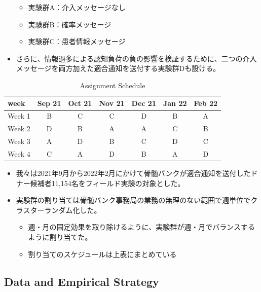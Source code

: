 \documentclass[
  a4paperpaper,
]{article}
\providecommand{\tightlist}{%
  \setlength{\itemsep}{0pt}\setlength{\parskip}{0pt}}\usepackage{longtable,booktabs,array}
\begin{document}
\begin{itemize}
  \begin{itemize}
  \tightlist
  \item
    実験群A：介入メッセージなし
  \item
    実験群B：確率メッセージ
  \item
    実験群C：患者情報メッセージ
  \end{itemize}
\item
  さらに、情報過多による認知負荷の負の影響を検証するために、二つの介入メッセージを両方加えた適合通知を送付する実験群Dも設ける。
\end{itemize}

\begin{table}

\caption{Assignment Schedule}
\centering
\begin{tabular}[t]{lcccccc}
\toprule
week & Sep 21 & Oct 21 & Nov 21 & Dec 21 & Jan 22 & Feb 22\\
\midrule
Week 1 & B & C & C & D & B & A\\
Week 2 & D & B & A & A & C & B\\
Week 3 & A & D & B & C & D & C\\
Week 4 & C & A & D & B & A & D\\
\bottomrule
\end{tabular}
\end{table}

\begin{itemize}
\tightlist
\item
  我々は2021年9月から2022年2月にかけて骨髄バンクが適合通知を送付したドナー候補者11,154名をフィールド実験の対象とした。
\item
  実験群の割り当ては骨髄バンク事務局の業務の無理のない範囲で週単位でクラスターランダム化した。

  \begin{itemize}
  \tightlist
  \item
    週・月の固定効果を取り除けるように、実験群が週・月でバランスするように割り当てた。
  \item
    割り当てのスケジュールは上表にまとめている
  \end{itemize}
\end{itemize}

\hypertarget{data-and-empirical-strategy}{%
\subsection{Data and Empirical
Strategy}\label{data-and-empirical-strategy}}
\end{document}
